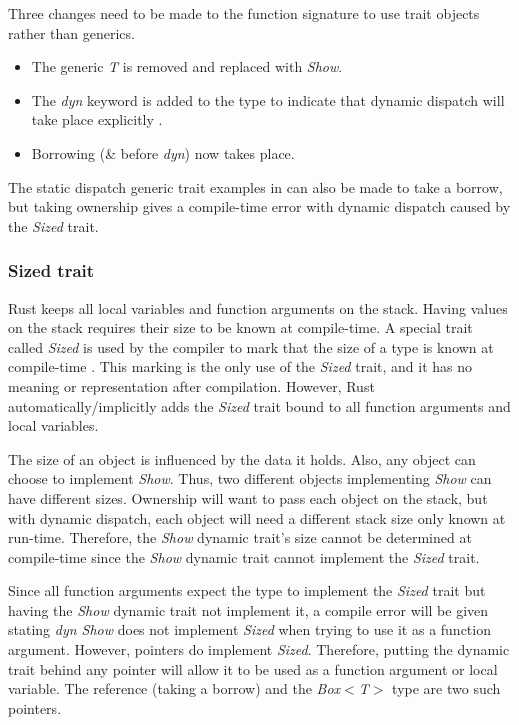 
Three changes need to be made to the function signature to use trait objects rather than generics.
\begin{itemize}
	\item The generic \textit{T} is removed and replaced with \textit{Show}.
	\item The \textit{dyn} keyword is added to the type to indicate that dynamic dispatch will take place explicitly \cite{klabnik_2019_01}.
	\item Borrowing (\& before \textit{dyn}) now takes place.
\end{itemize}

The static dispatch generic trait examples in  can also be made to take a borrow, but taking ownership gives a compile-time error with dynamic dispatch caused by the \textit{Sized} trait.

\subsubsection{Sized trait}
Rust keeps all local variables and function arguments on the stack.
Having values on the stack requires their size to be known at compile-time.
A special trait called \textit{Sized} is used by the compiler to mark that the size of a type is known at compile-time \cite{klabnik_2019_01}.
This marking is the only use of the \textit{Sized} trait, and it has no meaning or representation after compilation.
However, Rust automatically/implicitly adds the \textit{Sized} trait bound to all function arguments and local variables.

The size of an object is influenced by the data it holds.
Also, any object can choose to implement \textit{Show}.
Thus, two different objects implementing \textit{Show} can have different sizes.
Ownership will want to pass each object on the stack, but with dynamic dispatch, each object will need a different stack size only known at run-time.
Therefore, the \textit{Show} dynamic trait's size cannot be determined at compile-time since the \textit{Show} dynamic trait cannot implement the \textit{Sized} trait.

Since all function arguments expect the type to implement the \textit{Sized} trait but having the \textit{Show} dynamic trait not implement it, a compile error will be given stating \textit{dyn Show} does not implement \textit{Sized} when trying to use it as a function argument.
However, pointers do implement \textit{Sized}.
Therefore, putting the dynamic trait behind any pointer will allow it to be used as a function argument or local variable.
The reference (taking a borrow) and the \textit{Box$<$T$>$} type are two such pointers\cite{klabnik_2019_01}.

